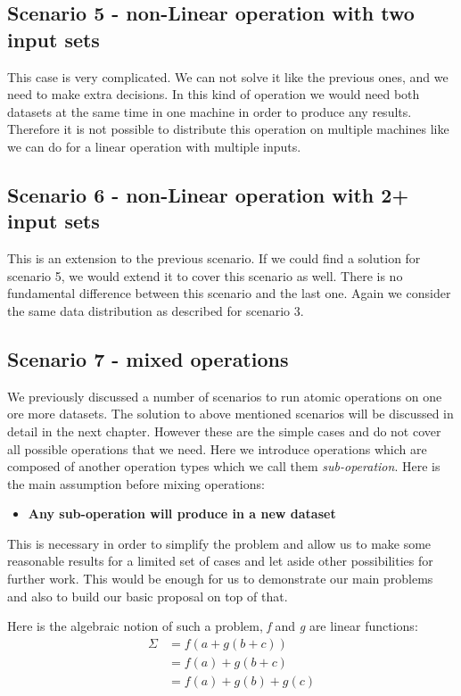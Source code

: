 \subsection{Scenario 5 - non-Linear operation with two input sets}
This case is very complicated. We can not solve it like the previous ones, and we need to make extra decisions.
In this kind of operation we would need both datasets at the same time in one machine in order to produce any
results. Therefore it is not possible to distribute this operation on multiple machines like we can do for 
a linear operation with multiple inputs. 

\subsection{Scenario 6 - non-Linear operation with 2+ input sets}
This is an extension to the previous scenario. 
If we could find a solution for scenario 5, we would extend it to cover this scenario as well. 
There is no fundamental difference between this scenario and the last one. Again we consider the same
data distribution as described for scenario 3.

\subsection{Scenario 7 - mixed operations}
We previously discussed a number of scenarios to run atomic operations on one ore more datasets. The solution to 
above mentioned scenarios will be discussed in detail in the next chapter. However these are the simple cases and
do not cover all possible operations that we need. Here we introduce operations which are composed of another
operation types which we call them \textit{sub-operation}.
Here is the main assumption before mixing operations:

\begin{itemize}
\item \textbf{Any sub-operation will produce in a new dataset}
\end{itemize}

This is necessary in order to simplify the problem and allow us to make some reasonable results
for a limited set of cases and let aside other possibilities for further work. This would be enough
for us to demonstrate our main problems and also to build our basic proposal on top of that.

Here is the algebraic notion of such a problem, \textit{f} and \textit{g} are linear functions:
\begin{subequations}
\begin{align*}
\Sigma &= f(a + g(b + c))\\
&= f(a) + g(b + c)\\
&= f(a) + g(b) + g(c)
\end{align*}
\end{subequations}


